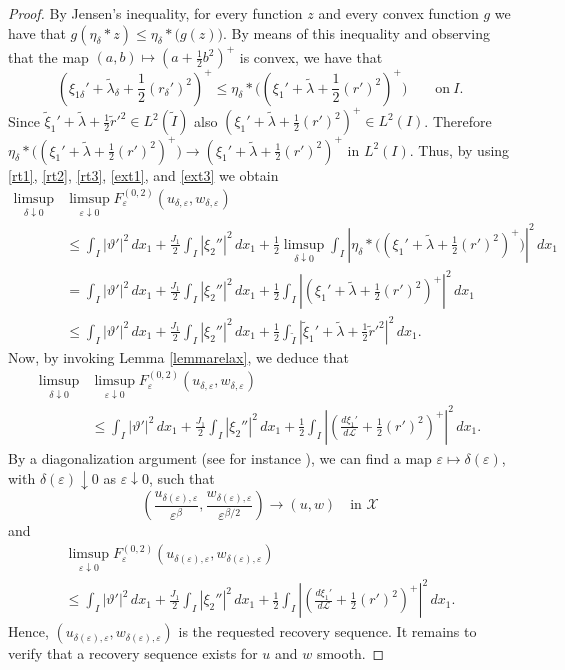 \documentclass[a4, 11pt, reqno, final]{amsart}
\newcommand{\calL}{\mathcal{L}}
\newcommand{\calX}{\mathcal{X}}
\newcommand\e{\varepsilon}
\theoremstyle{plain}%
\begin{document}
\begin{proof}
		By Jensen's inequality, for every  function $z$ and every convex function $g$ we have that
		$g(\eta_\delta \ast z)\le \eta_\delta\ast \big(g(z)\big)$. By means of this inequality and observing that the map $(a,b)\mapsto (a + \frac12 b^2)^+$ is convex, we have that
		\begin{equation}\label{rt3}(\xi_{1\delta}' +\widetilde{\lambda}_\delta+ \frac12 (r_\delta')^2)^+
			\le \eta_\delta\ast\big((\xi_1' +\widetilde{\lambda}+ \frac12 (r')^2)^+\big) \qquad \text{on} \ I.
		\end{equation}
		Since $\widetilde{\xi}_1' + \widetilde{\lambda} + \frac12 \widetilde{r}'^2 \in L^2(\widetilde{I})$ also $(\xi_1' +\widetilde{\lambda}+ \frac12 (r')^2)^+\in L^2(I)$. Therefore $\eta_\delta\ast\big((\xi_1' +\widetilde{\lambda}+ \frac12 (r')^2)^+\big)\to (\xi_1' +\widetilde{\lambda}+ \frac12 (r')^2)^+$ in $L^2(I)$.
		Thus, by using \eqref{rt1}, \eqref{rt2}, \eqref{rt3}, \eqref{ext1}, and \eqref{ext3} we obtain
		$$ \begin{aligned}
			\limsup_{\delta\downarrow 0}&\limsup_{\e\downarrow 0} F_{\e}^{(0,2)}(u_{\delta,\e}, w_{\delta, \e}) \\
			&\le  \int_I |\vartheta'|^2 \,dx_1 + \frac{J_1}{2}\int_I | \xi_{2}'' |^2 \,dx_1 + \frac12 \limsup_{\delta\downarrow 0}\int_I | \eta_\delta\ast\big((\xi_1' +\widetilde{\lambda}+ \frac12 (r')^2)^+\big)|^2 \,dx_1\\
			&=  \int_I |\vartheta'|^2 \,dx_1 + \frac{J_1}{2}\int_I | \xi_{2}'' |^2 \,dx_1 + \frac12 \int_I | (\xi_1' +\widetilde{\lambda}+ \frac12 (r')^2)^+|^2 \,dx_1\\
			&\le\int_I |\vartheta'|^2 \,dx_1 + \frac{J_1}{2}\int_I | \xi_{2}'' |^2 \,dx_1 + \frac12\int_{\widetilde{I}} | \widetilde{\xi}_{1}' + \widetilde{\lambda} + \frac12 \widetilde{r}'^2 |^2 \,dx_1.
		\end{aligned}$$
		Now, by invoking Lemma \ref{lemmarelax}, we deduce that
		$$ \begin{aligned}
			\limsup_{\delta\downarrow 0}&\limsup_{\e\downarrow 0} F_{\e}^{(0,2)}(u_{\delta,\e}, w_{\delta, \e}) \\
			&\le  \int_I |\vartheta'|^2 \,dx_1 + \frac{J_1}{2}\int_I | \xi_{2}'' |^2 \,dx_1 + \frac12 \int_I | (\frac{d\xi_1'}{d\calL} +\frac12 (r')^2)^+|^2 \,dx_1.		\end{aligned}$$
		By a diagonalization argument (see for instance \cite[Corollary 1.16]{Attouch}), we can find a map $\e \mapsto \delta(\e)$, with $\delta(\e)\downarrow 0$ as $\e\downarrow 0$, such that
		$$
		(\frac{u_{\delta(\e),\e}}{\e^\beta},\frac{w_{\delta(\e),\e}}{\e^{\beta/2}})\to (u,w)\quad \mbox{in }\calX
		$$
		and
		\begin{multline}\limsup_{\e\downarrow 0} F_{\e}^{(0,2)}(u_{\delta(\e),\e}, w_{\delta(\e), \e}) \\ \leq \int_I |\vartheta'|^2 \,dx_1 + \frac{J_1}{2}\int_I | \xi_{2}'' |^2 \,dx_1 + \frac12 \int_I | (\frac{d\xi_1'}{d\calL} +\frac12 (r')^2)^+|^2 \,dx_1.\end{multline}
		Hence, $(u_{\delta(\e),\e}, w_{\delta(\e), \e})$ is the requested recovery sequence.
		It remains to verify that a recovery sequence exists for $u$ and $w$ smooth.




\end{proof}
\end{document}
